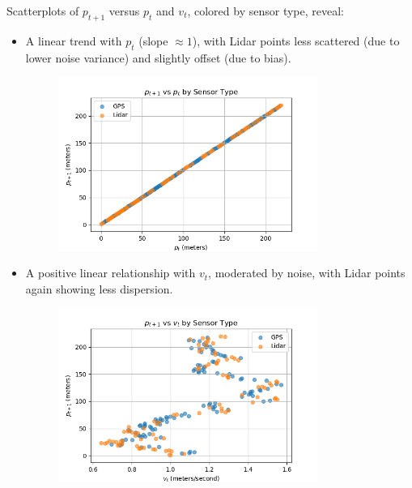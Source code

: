 \documentclass[12pt]{article}
\begin{document}
Scatterplots of \( p_{t+1} \) versus \( p_t \) and \( v_t \), colored by sensor type, reveal:
\begin{itemize}
    \item A linear trend with \( p_t \) (slope \(\approx 1\)), with Lidar points less scattered (due to lower noise variance) and slightly offset (due to bias).
\begin{figure}[h]
    \centering
    \includegraphics[width=0.8\textwidth]{scatter_p_t_vs_p_t_plus_1.png}
\end{figure}


    \item A positive linear relationship with \( v_t \), moderated by noise, with Lidar points again showing less dispersion.
\begin{figure}[h]
    \centering
    \includegraphics[width=0.8\textwidth]{scatter_v_t_vs_p_t_plus_1.png}
\end{figure}
\end{itemize}
\end{document}
